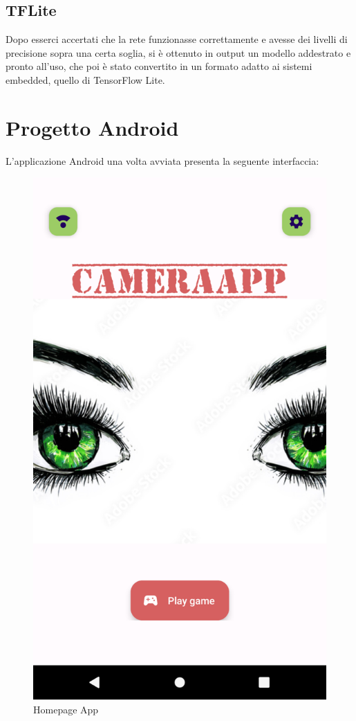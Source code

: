 \documentclass[11pt]{article}
\begin{document}
\subsection{TFLite}
Dopo esserci accertati che la rete funzionasse correttamente e avesse dei livelli di precisione sopra una certa soglia, si è ottenuto in output un modello addestrato
e pronto all’uso, che poi è stato convertito in un formato adatto ai sistemi embedded, quello di TensorFlow Lite.


\newpage
\section{Progetto Android}
L'applicazione Android una volta avviata presenta la seguente interfaccia:
\begin{figure}[h]
\caption{Homepage App }
\centering
\includegraphics[scale=0.2]{img/home.png}
\end{figure}
\end{document}
